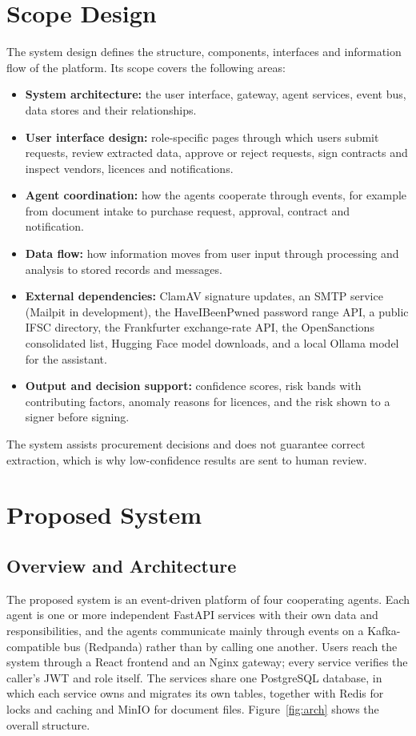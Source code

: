 \section{Scope Design}
The system design defines the structure, components, interfaces and information flow of the platform. Its scope covers the following areas:
\begin{itemize}
  \item \textbf{System architecture:} the user interface, gateway, agent services, event bus, data stores and their relationships.
  \item \textbf{User interface design:} role-specific pages through which users submit requests, review extracted data, approve or reject requests, sign contracts and inspect vendors, licences and notifications.
  \item \textbf{Agent coordination:} how the agents cooperate through events, for example from document intake to purchase request, approval, contract and notification.
  \item \textbf{Data flow:} how information moves from user input through processing and analysis to stored records and messages.
  \item \textbf{External dependencies:} ClamAV signature updates, an SMTP service (Mailpit in development), the HaveIBeenPwned password range API, a public IFSC directory, the Frankfurter exchange-rate API, the OpenSanctions consolidated list, Hugging Face model downloads, and a local Ollama model for the assistant.
  \item \textbf{Output and decision support:} confidence scores, risk bands with contributing factors, anomaly reasons for licences, and the risk shown to a signer before signing.
\end{itemize}
The system assists procurement decisions and does not guarantee correct extraction, which is why low-confidence results are sent to human review.

\section{Proposed System}

\subsection{Overview and Architecture}
The proposed system is an event-driven platform of four cooperating agents. Each agent is one or more independent FastAPI services with their own data and responsibilities, and the agents communicate mainly through events on a Kafka-compatible bus (Redpanda) rather than by calling one another. Users reach the system through a React frontend and an Nginx gateway; every service verifies the caller's JWT and role itself. The services share one PostgreSQL database, in which each service owns and migrates its own tables, together with Redis for locks and caching and MinIO for document files. Figure~\ref{fig:arch} shows the overall structure.

